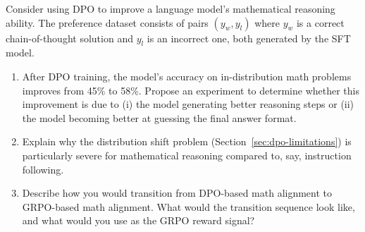 \begin{exercise}
\label{ex:dpo-math-reasoning}
Consider using DPO to improve a language model's mathematical reasoning ability. The preference dataset consists of pairs $(y_w, y_l)$ where $y_w$ is a correct chain-of-thought solution and $y_l$ is an incorrect one, both generated by the SFT model.
\begin{enumerate}
  \item After DPO training, the model's accuracy on in-distribution math problems improves from 45\% to 58\%. Propose an experiment to determine whether this improvement is due to (i) the model generating better reasoning steps or (ii) the model becoming better at guessing the final answer format.
  \item Explain why the distribution shift problem (Section~\ref{sec:dpo-limitations}) is particularly severe for mathematical reasoning compared to, say, instruction following.
  \item Describe how you would transition from DPO-based math alignment to GRPO-based math alignment. What would the transition sequence look like, and what would you use as the GRPO reward signal?
\end{enumerate}
\end{exercise}
